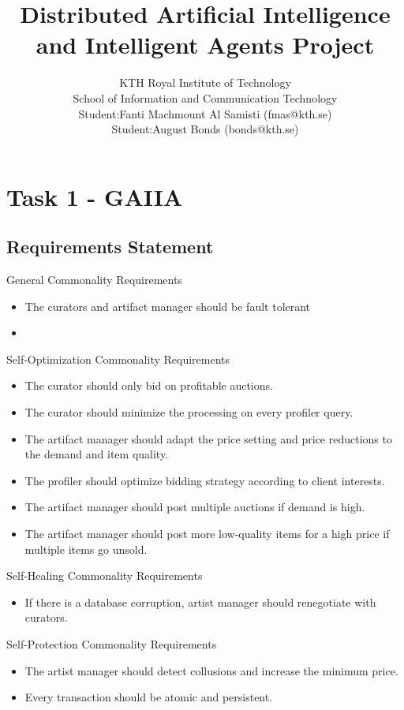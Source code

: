 \documentclass[a4paper, 11pt]{article}
\title{\textbf{Distributed Artificial Intelligence and Intelligent Agents Project}}
\author{KTH Royal Institute of Technology \\ 
		School of Information and Communication Technology \\
		Student:Fanti Machmount Al Samisti (fmas@kth.se) \\
		Student:August Bonds (bonds@kth.se)}
\begin{document}
	
\maketitle

\tableofcontents

\section{Task 1 - GAIIA}

\subsection{Requirements Statement}

General Commonality Requirements
\begin{itemize}
\item The curators and artifact manager should be fault tolerant
\item 
\end{itemize}

Self-Optimization Commonality Requirements
\begin{itemize}
\item The curator should only bid on profitable auctions.
\item The curator should minimize the processing on every profiler query.
\item The artifact manager should adapt the price setting and price reductions to the demand and item quality.
\item The profiler should optimize bidding strategy according to client interests.
\item The artifact manager should post multiple auctions if demand is high. 
\item The artifact manager should post more low-quality items for a high price if multiple items go unsold. 
\end{itemize}

Self-Healing Commonality Requirements
\begin{itemize}
\item If there is a database corruption, artist manager should renegotiate with curators. 
\end{itemize}

Self-Protection Commonality Requirements
\begin{itemize}
\item The artist manager should detect collusions and increase the minimum price.
\item Every transaction should be atomic and persistent.
\end{itemize}
\end{document}
